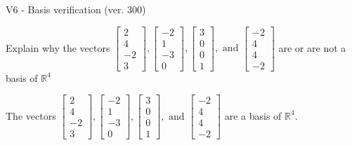 \begin{exercise}
  \begin{exerciseTitle}V6 - Basis verification (ver. 300)\end{exerciseTitle}
  \begin{exerciseStatement}
    Explain why the vectors \(\left[\begin{array}{r}
2 \\
4 \\
-2 \\
3
\end{array}\right] , \left[\begin{array}{r}
-2 \\
1 \\
-3 \\
0
\end{array}\right] , \left[\begin{array}{r}
3 \\
0 \\
0 \\
1
\end{array}\right] , \text{ and } \left[\begin{array}{r}
-2 \\
4 \\
4 \\
-2
\end{array}\right]\) are or are not a basis of \(\mathbb{R}^4\)	


  \end{exerciseStatement}
  \begin{exerciseAnswer}
   The vectors \(\left[\begin{array}{r}
2 \\
4 \\
-2 \\
3
\end{array}\right] , \left[\begin{array}{r}
-2 \\
1 \\
-3 \\
0
\end{array}\right] , \left[\begin{array}{r}
3 \\
0 \\
0 \\
1
\end{array}\right] , \text{ and } \left[\begin{array}{r}
-2 \\
4 \\
4 \\
-2
\end{array}\right]\) 
  	 are  a basis of \(\mathbb{R}^4\).
  


  \end{exerciseAnswer}
\end{exercise}